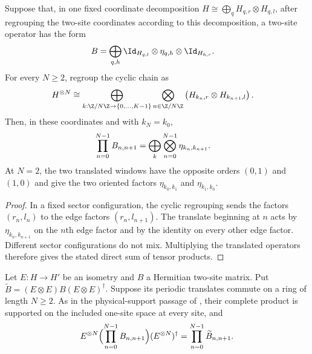 \begin{lemma}
    \label{thm:mpdo_eta_pair_bond_cyclic_product_transport}
    \leanok
    Suppose that, in one fixed coordinate decomposition
    $H\cong\bigoplus_q H_{q,r}\otimes H_{q,l}$,
    after regrouping the two-site coordinates according to this decomposition,
    a two-site operator has the form
    \begin{align}
        B
         & =\bigoplus_{q,h}
        \Id_{H_{q,l}}\otimes\eta_{q,h}\otimes\Id_{H_{h,r}}.
        \notag
    \end{align}
    For every $N\ge2$, regroup the cyclic chain as
    \begin{align}
        H^{\otimes N}
         & \cong
        \bigoplus_{k:\Z/N\Z\to\{0,\ldots,K-1\}}
        \bigotimes_{n\in\Z/N\Z}
        \left(H_{k_n,r}\otimes H_{k_{n+1},l}\right).
        \notag
    \end{align}
    Then, in these coordinates and with $k_N=k_0$,
    \begin{align}
        \prod_{n=0}^{N-1}B_{n,n+1}
         & =
        \bigoplus_k\bigotimes_{n=0}^{N-1}\eta_{k_n,k_{n+1}}.
        \notag
    \end{align}
    At $N=2$, the two translated windows have the opposite orders $(0,1)$
    and $(1,0)$ and give the two oriented factors
    $\eta_{k_0,k_1}$ and $\eta_{k_1,k_0}$.
\end{lemma}

\begin{proof}\leanok
    In a fixed sector configuration, the cyclic regrouping sends the factors
    $(r_n,l_n)$ to the edge factors $(r_n,l_{n+1})$. The translate beginning
    at $n$ acts by $\eta_{k_n,k_{n+1}}$ on the $n$th edge factor and by the
    identity on every other edge factor. Different sector configurations do
    not mix. Multiplying the translated operators therefore gives the stated
    direct sum of tensor products.
\end{proof}

\begin{lemma}
    \label{thm:mpdo_isometric_commuting_bond_product}
    \leanok
    Let $E:H\to H'$ be an isometry and $B$ a Hermitian two-site
    matrix. Put $\widetilde B=(E\otimes E)B(E\otimes E)^\dagger$.
    Suppose its periodic translates commute on a ring of length $N\ge2$.
    As in the physical-support passage of
    \cite[Appendix~C.2]{Cirac2016MPDO_arXiv}, their complete product is
    supported on the included one-site space at every site, and
    \begin{align}
        E^{\otimes N}\Bigl(\prod_{n=0}^{N-1}B_{n,n+1}\Bigr)
        (E^{\otimes N})^\dagger
        =\prod_{n=0}^{N-1}\widetilde B_{n,n+1}.
        \notag
    \end{align}
\end{lemma}

